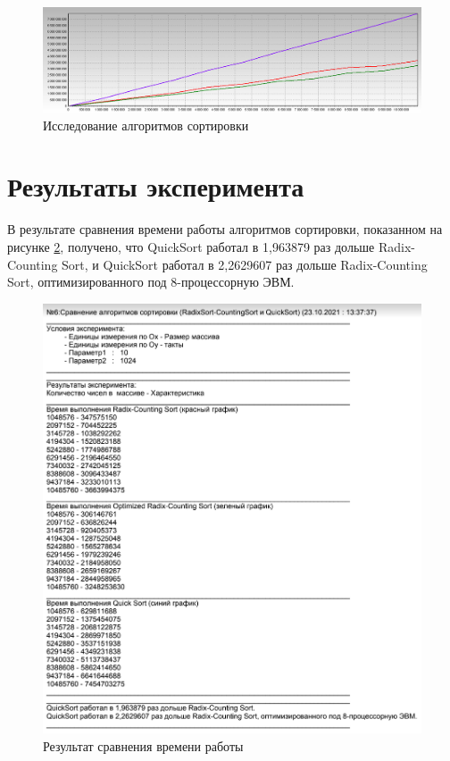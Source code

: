 \begin{figure}[H]
	\begin{center}
		\includegraphics[scale=0.3]{img/sort.jpg}
	\end{center}
	\captionsetup{justification=centering}
	\caption{Исследование алгоритмов сортировки}
	\label{img:sort}
\end{figure}

\section{Результаты эксперимента}

В результате сравнения времени работы алгоритмов сортировки, показанном на рисунке \ref{img:sort_result}, получено, что QuickSort работал в 1,963879 раз дольше Radix-Counting Sort, и 
QuickSort работал в 2,2629607 раз дольше Radix-Counting Sort, оптимизированного под 8-процессорную ЭВМ.

\begin{figure}[H]
	\begin{center}
		\includegraphics[scale=0.4]{img/sort_result.png}
	\end{center}
	\captionsetup{justification=centering}
	\caption{Результат сравнения времени работы}
	\label{img:sort_result}
\end{figure}

